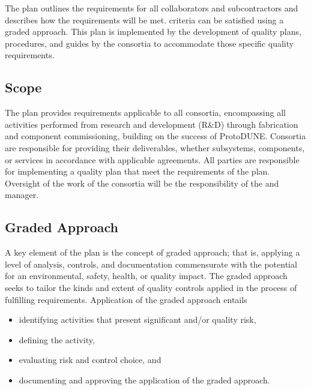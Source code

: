 The   plan outlines the 
requirements for all  collaborators and
subcontractors and describes how the requirements will be met.
 criteria can be satisfied using a graded approach. This
 plan is implemented by the development of quality plans,
procedures, and guides by the consortia to accommodate those specific
quality requirements.

\subsection{Scope}

The   plan provides 
requirements applicable to all consortia, encompassing all activities
performed from research and development (R\&D) through fabrication and
component commissioning, building on the success of
ProtoDUNE. Consortia are responsible for providing their deliverables,
whether subsystems, components, or services in accordance with
applicable agreements. All parties are responsible for
implementing a quality plan that meet the requirements of the
  plan. Oversight of the work of
the consortia will be the responsibility of the 
 and  
manager.

\subsection{Graded Approach}

A key element of the   plan is the
concept of graded approach; that is, applying a level of analysis,
controls, and documentation commensurate with the potential for an
environmental, safety, health, or quality impact. The graded approach
seeks to tailor the kinds and extent of quality controls applied in
the process of fulfilling requirements. Application of the graded
approach entails
\begin{itemize}
  \item identifying activities that present significant 
    and/or quality risk,
  \item defining the activity,
  \item evaluating risk and control choice, and 
  \item documenting and approving the application of the graded
    approach.
\end{itemize}

